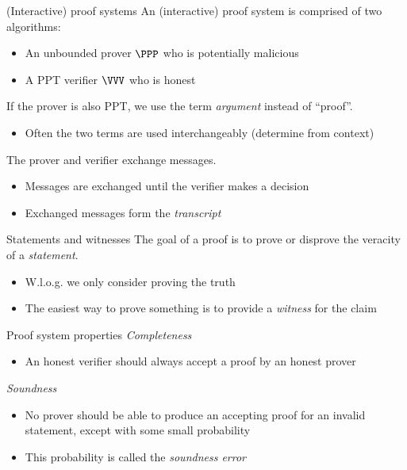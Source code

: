 \begin{frame}{(Interactive) proof systems}
  An (interactive) proof system is comprised of two algorithms:
  \begin{itemize}[<+(1)->]
    \item An unbounded prover $\PPP$ who is potentially malicious
    \item A PPT verifier $\VVV$ who is honest
  \end{itemize}

  \vspace*{1em}
  
  \pause
  If the prover is also PPT, we use the term \emph{argument} instead of \enquote{proof}.
  \begin{itemize}[<+(1)->]
    \item Often the two terms are used interchangeably (determine from context)
  \end{itemize}

  \vspace*{1em}

  \pause
  The prover and verifier exchange messages.
  \begin{itemize}[<+(1)->]
    \item Messages are exchanged until the verifier makes a decision
    \item Exchanged messages form the \emph{transcript}
  \end{itemize}
\end{frame}

\begin{frame}{Statements and witnesses}
  \pause
  The goal of a proof is to prove or disprove the veracity of a \emph{statement}.
  \begin{itemize}[<+(1)->]
    \item W.l.o.g. we only consider proving the truth
    \item The easiest way to prove something is to provide a \emph{witness} for the claim
  \end{itemize}
\end{frame}

\begin{frame}{Proof system properties}
  \pause
  \emph{Completeness}
  \begin{itemize}[<+(1)->]
    \item An honest verifier should always accept a proof by an honest prover
  \end{itemize}

  \vspace*{1em}

  \pause
  \emph{Soundness}
  \begin{itemize}[<+(1)->]
    \item No prover should be able to produce an accepting proof for an invalid statement, except with some small probability
    \item This probability is called the \emph{soundness error}
  \end{itemize}
\end{frame}

